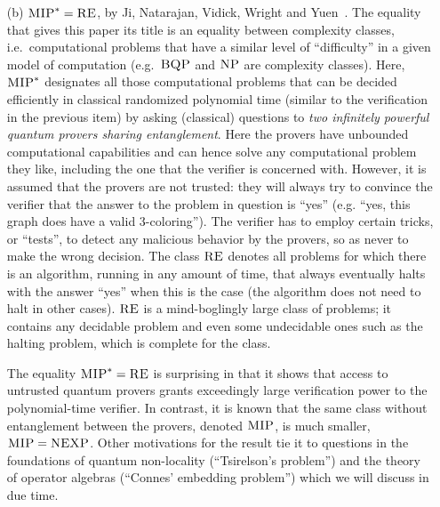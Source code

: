\begin{itemize}
\item[(b)] $\textsc{MIP}^*=\textsc{RE}$, by Ji, Natarajan, Vidick, Wright and Yuen~\cite{ji2020mip}. The equality that gives this paper its title is an equality between complexity classes, i.e.\ computational problems that have a similar level of ``difficulty'' in a given model of computation (e.g.\ $\textsc{BQP}$ and $\textsc{NP}$ are complexity classes). Here, $\textsc{MIP}^*$ designates all those computational problems that can be decided efficiently in classical randomized polynomial time (similar to the verification in the previous item) by asking (classical) questions to \emph{two infinitely powerful quantum provers sharing entanglement}. Here the provers have unbounded computational capabilities and can hence solve any computational problem they like, including the one that the verifier is concerned with. However, it is assumed that the provers are not trusted: they will always try to convince the verifier that the answer to the problem in question is ``yes'' (e.g. ``yes, this graph does have a valid $3$-coloring''). The verifier has to employ certain tricks, or ``tests'', to detect any malicious behavior by the provers, so as never to make the wrong decision. The class $\textsc{RE}$ denotes all problems for which there is an algorithm, running in any amount of time, that always eventually halts with the answer ``yes'' when this is the case (the algorithm does not need to halt in other cases). $\textsc{RE}$ is a mind-boglingly large class of problems; it contains any decidable problem and even some undecidable ones such as the halting problem, which is complete for the class. 

The equality $\textsc{MIP}^* = \textsc{RE}$ is surprising in that it shows that access to untrusted quantum provers grants exceedingly large verification power to the polynomial-time verifier. In contrast, it is known that the same class without entanglement between the provers, denoted $\textsc{MIP}$, is much smaller, $\textsc{MIP}=\textsc{NEXP}$. Other motivations for the result tie it to questions in the foundations of quantum non-locality (``Tsirelson's problem'') and the theory of operator algebras (``Connes' embedding problem'') which we will discuss in due time. 
\end{itemize}

